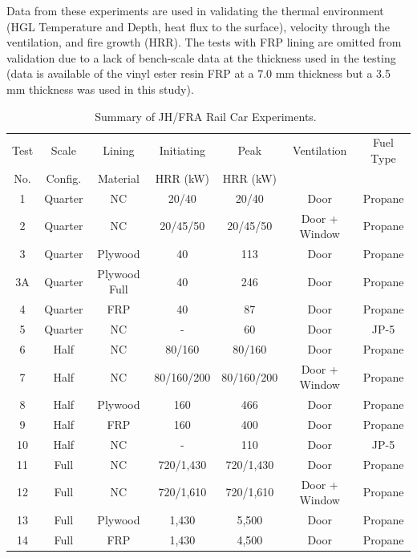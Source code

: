 Data from these experiments are used in validating the thermal environment (HGL Temperature and Depth, heat flux to the surface), velocity through the ventilation, and fire growth (HRR).
The tests with FRP lining are omitted from validation due to a lack of bench-scale data at the thickness used in the testing (data is available of the vinyl ester resin FRP at a 7.0 mm thickness but a 3.5 mm thickness was used in this study).

\begin{table}[!htb]
\caption[Summary of JH/FRA Rail Car Experiments]{Summary of JH/FRA Rail Car Experiments.~\cite{Hodges:FRA22}}
\begin{center}
\begin{tabular}{|c|c|c|c|c|c|c|}
\hline
Test & Scale   & Lining   &  Initiating & Peak       & Ventilation   & Fuel Type \\
No.  & Config. & Material &  HRR (kW)   & HRR (kW)   &               &           \\ \hline \hline
1    & Quarter & NC       & 20/40       & 20/40      & Door          & Propane   \\ \hline
2    & Quarter & NC       & 20/45/50    & 20/45/50   & Door + Window & Propane   \\ \hline
3    & Quarter & Plywood  & 40          & 113        & Door          & Propane   \\ \hline
3A    & Quarter & Plywood Full  & 40          & 246        & Door          & Propane   \\ \hline
4    & Quarter & FRP      & 40          & 87         & Door          & Propane   \\ \hline
5    & Quarter & NC       & -           & 60         & Door          & JP-5      \\ \hline
6    & Half    & NC       & 80/160      & 80/160     & Door          & Propane   \\ \hline
7    & Half    & NC       & 80/160/200  & 80/160/200 & Door + Window & Propane   \\ \hline
8    & Half    & Plywood  & 160         & 466        & Door          & Propane   \\ \hline
9    & Half    & FRP      & 160         & 400        & Door          & Propane   \\ \hline
10   & Half    & NC       & -           & 110        & Door          & JP-5      \\ \hline
11   & Full    & NC       & 720/1,430   & 720/1,430  & Door          & Propane   \\ \hline
12   & Full    & NC       & 720/1,610   & 720/1,610  & Door + Window & Propane   \\ \hline
13   & Full    & Plywood  & 1,430       & 5,500      & Door          & Propane   \\ \hline
14   & Full    & FRP      & 1,430       & 4,500      & Door          & Propane   \\ \hline

\end{tabular}
\end{center}
\label{JH_FRA_Matrix}
\end{table}

